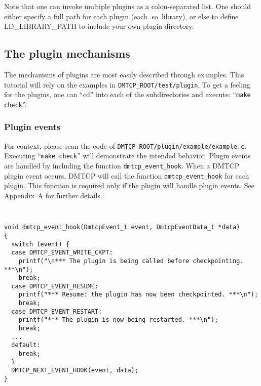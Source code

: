 \documentclass{article}
\begin{document}
Note that one can invoke multiple plugins as a colon-separated list.
One should either specify a full path for each plugin (each .so~library),
or else to define LD\_LIBRARY\_PATH to include your own plugin directory.

\subsection{The plugin mechanisms}

The mechanisms of plugins are most easily described through examples.
This tutorial will rely on the examples in {\tt DMTCP\_ROOT/test/plugin}.
To get a feeling for the plugins, one can ``cd'' into each of the
subdirectories and execute: ``{\tt make check}''.

\subsubsection{Plugin events}

For context, please scan the code of {\tt DMTCP\_ROOT/plugin/example/example.c}.
Executing ``{\tt make check}'' will demonstrate the intended behavior.
Plugin events are handled by including the function {\tt dmtcp\_event\_hook}.
When a DMTCP plugin event occurs, DMTCP will call the
function {\tt dmtcp\_event\_hook} for each plugin.
This function is required only if the plugin will handle plugin events.
See Appendix~A for further details.

{\tt
\begin{verbatim}
void dmtcp_event_hook(DmtcpEvent_t event, DmtcpEventData_t *data)
{
  switch (event) {
  case DMTCP_EVENT_WRITE_CKPT:
    printf("\n*** The plugin is being called before checkpointing. ***\n");
    break;
  case DMTCP_EVENT_RESUME:
    printf("*** Resume: the plugin has now been checkpointed. ***\n");
    break;
  case DMTCP_EVENT_RESTART:
    printf("*** The plugin is now being restarted. ***\n");
    break;
  ...
  default:
    break;
  }
  DMTCP_NEXT_EVENT_HOOK(event, data);
}
\end{verbatim}
}


%
%
\end{document}
